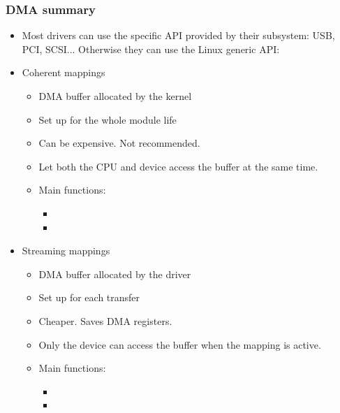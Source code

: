 \begin{frame}
  \frametitle{DMA summary}
  \begin{itemize}
  \item Most drivers can use the specific API provided by their
    subsystem: USB, PCI, SCSI... Otherwise they can use the Linux
    generic API:
  \item Coherent mappings
    \begin{itemize}
    \item DMA buffer allocated by the kernel
    \item Set up for the whole module life
    \item Can be expensive. Not recommended.
    \item Let both the CPU and device access the buffer at the same
      time.
    \item Main functions:
      \begin{itemize}
      \item {}
      \item {}
      \end{itemize}
    \end{itemize}
  \item Streaming mappings
    \begin{itemize}
    \item DMA buffer allocated by the driver
    \item Set up for each transfer
    \item Cheaper. Saves DMA registers.
    \item Only the device can access the buffer when the mapping is
      active.
    \item Main functions:
      \begin{itemize}
      \item {}
      \item {}
      \end{itemize}
    \end{itemize}
  \end{itemize}
\end{frame}
